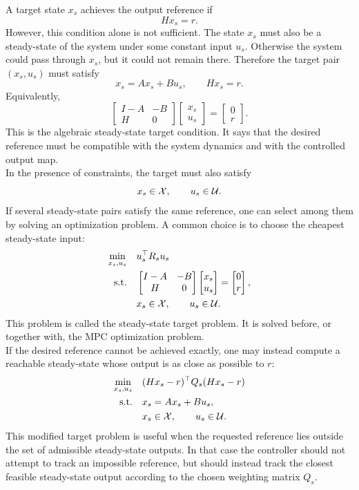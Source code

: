 A target state \(x_s\) achieves the output reference if
\[
    Hx_s = r.
\]
However, this condition alone is not sufficient. The state \(x_s\) must also be a steady-state of
the system under some constant input \(u_s\). Otherwise the system could pass through \(x_s\),
but it could not remain there. Therefore the target pair \((x_s,u_s)\) must satisfy
\[
    x_s = Ax_s + Bu_s,
    \qquad
    Hx_s = r.
\]
Equivalently,
\[
    \begin{bmatrix}
        I-A & -B \\
        H   & 0
    \end{bmatrix}
    \begin{bmatrix}
        x_s \\ u_s
    \end{bmatrix}
    =
    \begin{bmatrix}
        0 \\ r
    \end{bmatrix}.
\]
This is the algebraic steady-state target condition. It says that the desired reference must be
compatible with the system dynamics and with the controlled output map.\\
In the presence of constraints, the target must also satisfy
\[
    x_s \in \mathcal{X}, \qquad u_s \in \mathcal{U}.
\]
If several steady-state pairs satisfy the same reference, one can select among them by solving an
optimization problem. A common choice is to choose the cheapest steady-state input:
\[
\begin{aligned}
    \min_{x_s,u_s} \quad & u_s^\top R_s u_s \\
    \text{s.t.} \quad &
    \begin{bmatrix}
        I-A & -B \\
        H   & 0
    \end{bmatrix}
    \begin{bmatrix}
        x_s \\ u_s
    \end{bmatrix}
    =
    \begin{bmatrix}
        0 \\ r
    \end{bmatrix},\\
    & x_s \in \mathcal{X},\qquad u_s \in \mathcal{U} .
\end{aligned}
\]
This problem is called the steady-state target problem. It is solved before, or together with, the
MPC optimization problem.\\
If the desired reference cannot be achieved exactly, one may instead compute a reachable
steady-state whose output is as close as possible to \(r\):
\[
\begin{aligned}
    \min_{x_s,u_s} \quad & (Hx_s-r)^\top Q_s (Hx_s-r) \\
    \text{s.t.} \quad & x_s = Ax_s + Bu_s,\\
    & x_s \in \mathcal{X},\qquad u_s \in \mathcal{U} .
\end{aligned}
\]
This modified target problem is useful when the requested reference lies outside the set of
admissible steady-state outputs. In that case the controller should not attempt to track an
impossible reference, but should instead track the closest feasible steady-state output according
to the chosen weighting matrix \(Q_s\).

